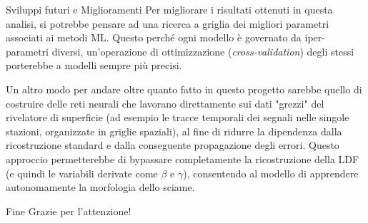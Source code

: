 \documentclass[10pt]{beamer}
\begin{document}
\begin{frame}{Sviluppi futuri e Miglioramenti}
Per migliorare i risultati ottenuti in questa analisi, si potrebbe pensare ad una ricerca a griglia dei migliori parametri associati ai metodi ML. Questo perché ogni modello è governato da iper-parametri diversi, un'operazione di ottimizzazione (\emph{cross-validation}) degli stessi porterebbe a modelli sempre più precisi.
\bigskip

Un altro modo per andare oltre quanto fatto in questo progetto sarebbe quello di costruire delle reti neurali che lavorano direttamente sui dati "grezzi" del rivelatore di superficie (ad esempio le tracce temporali dei segnali nelle singole stazioni, organizzate in griglie spaziali), al fine di ridurre la dipendenza dalla ricostruzione standard e dalla conseguente propagazione degli errori. Questo approccio permetterebbe di bypassare completamente la ricostruzione della LDF (e quindi le variabili derivate come $\beta$ e $\gamma$), consentendo al modello di apprendere autonomamente la morfologia dello sciame. 
\end{frame}

\begin{frame}{Fine}
	\centering
	\Huge Grazie per l'attenzione!
\end{frame}
\end{document}
